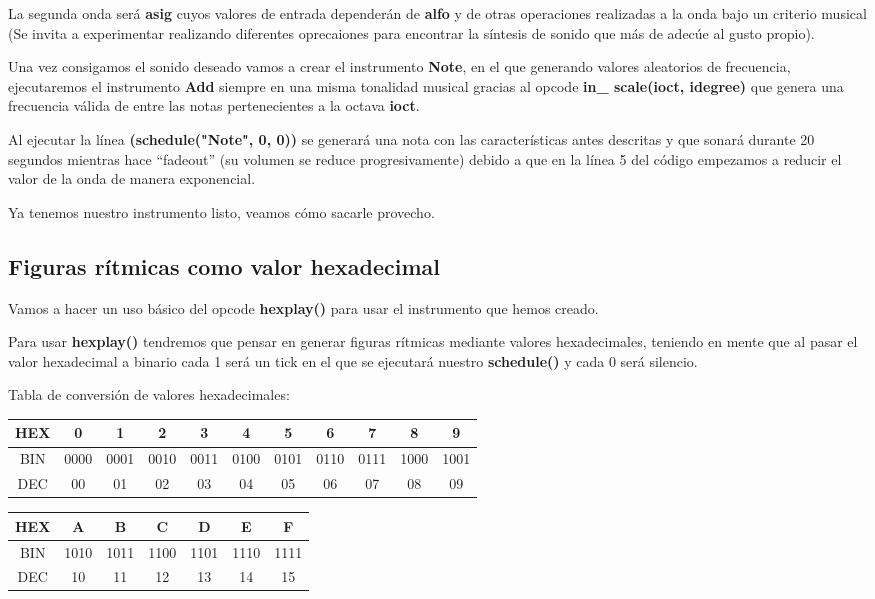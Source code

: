 La segunda onda será \textbf{asig} cuyos valores de entrada dependerán de \textbf{alfo} y de otras operaciones realizadas a la onda bajo un criterio musical (Se invita a experimentar realizando diferentes oprecaiones para encontrar la síntesis de sonido que más de adecúe al gusto propio).

Una vez consigamos el sonido deseado vamos a crear el instrumento \textbf{Note}, en el que generando valores aleatorios de frecuencia, ejecutaremos el instrumento \textbf{Add} siempre en una misma tonalidad musical gracias al opcode \textbf{in\_ scale(ioct, idegree)} que genera una frecuencia válida de entre las notas pertenecientes a la octava \textbf{ioct}.

Al ejecutar la línea \textbf{(schedule("Note", 0, 0))} se generará una nota con las características antes descritas y que sonará durante 20 segundos mientras hace ``fadeout'' (su volumen se reduce progresivamente) debido a que en la línea 5 del código empezamos a reducir el valor de la onda de manera exponencial.

Ya tenemos nuestro instrumento listo, veamos cómo sacarle provecho.

\subsection{Figuras rítmicas como valor hexadecimal}

Vamos a hacer un uso básico del opcode \textbf{hexplay()} para usar el instrumento que hemos creado. 

Para usar \textbf{hexplay()} tendremos que pensar en generar figuras rítmicas mediante valores hexadecimales, teniendo en mente que al pasar el valor hexadecimal a binario cada 1 será un tick en el que se ejecutará nuestro \textbf{schedule()} y cada 0 será silencio.

Tabla de conversión de valores hexadecimales:
\begin{center}
 \begin{tabular}{||c c c c c c c c c c c||} 
 \hline
 HEX & 0 & 1 & 2 & 3 & 4 & 5 & 6 & 7 & 8 & 9 \\
 \hline
 BIN & 0000 & 0001 & 0010 & 0011 & 0100 & 0101 & 0110 & 0111 & 1000 & 1001 \\ 
 \hline
 DEC & 00 & 01 & 02 & 03 & 04 & 05 & 06 & 07 & 08 & 09\\
 \hline
\end{tabular}
\end{center}

\begin{center}
 \begin{tabular}{||c c c c c c c||} 
 \hline
 HEX & A & B & C & D & E & F \\
 \hline
 BIN & 1010 & 1011 & 1100 & 1101 & 1110 & 1111\\ 
 \hline
 DEC & 10 & 11 & 12 & 13 & 14 & 15 \\
 \hline
\end{tabular}
\end{center}
\pagebreak
{}

